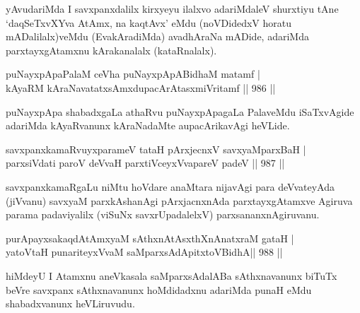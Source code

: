 \begin{artha}
yAvudariMda I savxpanxdalilx kirxyeyu ilalxvo adariMdaleV shurxtiyu tAne `daqSeTxvXYva AtAmx, na kaqtAvx' eMdu (noVDidedxV horatu mADalilalx)veMdu (EvakAradiMda) avadhAraNa mADide, adariMda parxtayxgAtamxnu kArakanalalx (kataRnalalx).
\end{artha}

\begin{shl}
puNayxpApaPalaM ceVha puNayxpApABidhaM matamf | \\
kAyaRM kAraNavatatxsAmxdupacArAtasxmiVritamf \hfill||  986 || 
\end{shl}

\begin{artha}
puNayxpApa shabadxgaLa athaRvu puNayxpApagaLa PalaveMdu iSaTxvAgide adariMda kAyaRvanunx kAraNadaMte aupacArikavAgi heVLide.
\end{artha}

\begin{shl}
savxpanxkamaRvuyxparameV tataH pArxjecnxV savxyaMparxBaH | \\
parxsiVdati \footnotemark[1]paroV deVvaH parxtiVceyxVva\footnotemark[2] pareV padeV \hfill||  987 ||  
\end{shl}

\begin{artha}
savxpanxkamaRgaLu niMtu hoVdare anaMtara nijavAgi para deVvateyAda (jiVvanu)
savxyaM parxkAshanAgi pArxjacnxnAda parxtayxgAtamxve Agiruva parama padaviyalilx (viSuNx savxrUpadalelxV) parxsananxnAgiruvanu.
\end{artha}


\begin{shl}
purA\s payxsakaqdAtAmx\s yaM sAthxnAtAsxthXnAnatxraM gataH | \\
yatoV\s taH punariteyxVvaM saMparxsAdApitxtoV\s BidhA\hfill ||  988 ||  
\end{shl}

\begin{artha}
hiMdeyU I Atamxnu aneVkasala saMparxsAdalABa sAthxnavanunx biTuTx beVre savxpanx sAthxnavanunx hoMdidadxnu adariMda punaH eMdu shabadxvanunx heVLiruvudu.
\end{artha}

